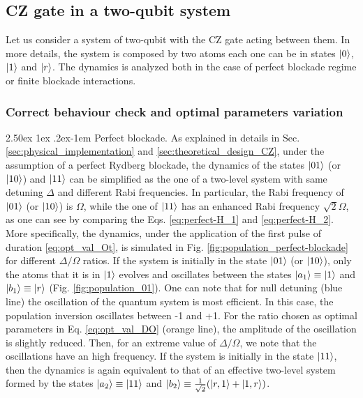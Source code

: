 \documentclass[rmp,10pt,onecolumn,fleqn,notitlepage]{revtex4-1}
\makeatletter
\renewcommand{\paragraph}{%
    \@startsection{paragraph}{4}%
    {\z@}{2.50ex \@plus 1ex \@minus .2ex}{-1em}%
    {\bf\sffamily}%
}
\makeatother
\begin{document}
\subsection{CZ gate in a two-qubit system}

Let us consider a system of two-qubit with the CZ gate acting between them. In more details, the system is composed by two atoms each one can be in states $\left\vert{0}\right\rangle$, $\left\vert{1}\right\rangle$ and $\left\vert{r}\right\rangle$. The dynamics is analyzed both in the case of perfect blockade regime or finite blockade interactions. 

\subsubsection{Correct behaviour check and optimal parameters variation}

\paragraph{Perfect blockade.} As explained in details in Sec. \ref{sec:physical_implementation} and \ref{sec:theoretical_design_CZ}, under the assumption of a perfect Rydberg blockade, the dynamics of the states $\left\vert{01}\right\rangle$ (or $\left\vert{10}\right\rangle$) and $\left\vert{11}\right\rangle$ can be simplified as the one of a two-level system with same detuning $\Delta$ and different Rabi frequencies. In particular, the Rabi frequency of $\left\vert{01}\right\rangle$ (or $\left\vert{10}\right\rangle$) is $\Omega$, while the one of $\left\vert{11}\right\rangle$ has an enhanced Rabi frequency $\sqrt{2}\Omega$, as one can see by comparing the Eqs. \eqref{eq:perfect-H_1} and \eqref{eq:perfect-H_2}. More specifically, the dynamics, under the application of the first pulse of duration \eqref{eq:opt_val_Ot}, is simulated in Fig. \ref{fig:population_perfect-blockade} for different $\Delta/\Omega$ ratios. If the system is initially in the state $\left\vert{01}\right\rangle$ (or $\left\vert{10}\right\rangle$), only the atoms that it is in $\left\vert{1}\right\rangle$ evolves and oscillates between the states $\left\vert{a_1}\right\rangle\equiv\left\vert{1}\right\rangle$ and $\left\vert{b_1}\right\rangle\equiv\left\vert{r}\right\rangle$ (Fig. \ref{fig:population_01}). 
One can note that for null detuning (blue line) the oscillation of the quantum system is most efficient. In this case, the population inversion oscillates between -1 and +1. For the ratio chosen as optimal parameters in Eq. \eqref{eq:opt_val_DO} (orange line), the amplitude of the oscillation is slightly reduced. Then, for an extreme value of $\Delta/\Omega$, we note that the oscillations have an high frequency. If the system is initially in the state $\left\vert{11}\right\rangle$, then the dynamics is again equivalent to that of an effective two-level system formed by the states $\left\vert{a_2}\right\rangle\equiv\left\vert{11}\right\rangle$ and $\left\vert{b_2}\right\rangle\equiv \frac{1}{\sqrt{2}} \qty( \left\vert{r,1}\right\rangle + \left\vert{1,r}\right\rangle )$.
\end{document}

